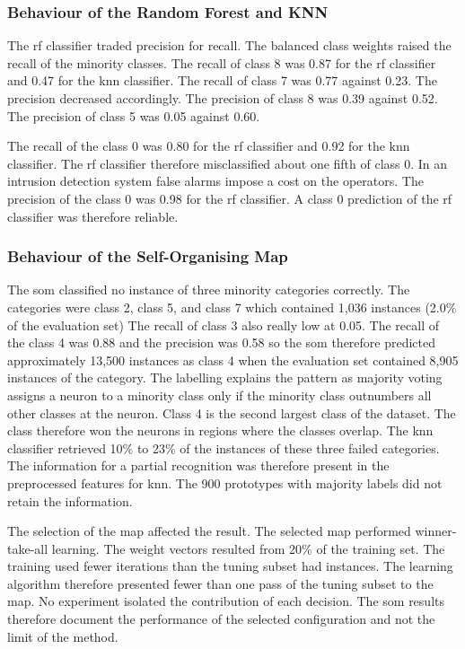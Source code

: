 \documentclass[conference]{IEEEtran}
\begin{document}
\subsubsection{Behaviour of the Random Forest and KNN}

The \gls{rf} classifier traded precision for recall.
The balanced class weights raised the recall of the minority classes.
The recall of class 8 was 0.87 for the \gls{rf} classifier and 0.47 for the \gls{knn} classifier.
The recall of class 7 was 0.77 against 0.23.
The precision decreased accordingly.
The precision of class 8 was 0.39 against 0.52.
The precision of class 5 was 0.05 against 0.60.

The recall of the class 0 was 0.80 for the \gls{rf} classifier and 0.92 for the \gls{knn} classifier.
The \gls{rf} classifier therefore misclassified about one fifth of class 0.
In an intrusion detection system false alarms impose a cost on the operators.
The precision of the class 0 was 0.98 for the \gls{rf} classifier.
A class 0 prediction of the \gls{rf} classifier was therefore reliable.

\subsubsection{Behaviour of the Self-Organising Map}

The \gls{som} classified no instance of three minority categories correctly.
The categories were class 2, class 5, and class 7 which contained 1,036 instances (2.0\% of the evaluation set)
The recall of class 3 also really low at 0.05.
The recall of the class 4 was 0.88 and the precision was 0.58 so the \gls{som} therefore predicted
approximately 13,500 instances as class 4 when the evaluation set contained 8,905 instances of the category.
The labelling explains the pattern as majority voting assigns a neuron to a minority class only if the minority
class outnumbers all other classes at the neuron.
Class 4 is the second largest class of the dataset.
The class therefore won the neurons in regions where the classes overlap.
The \gls{knn} classifier retrieved 10\% to 23\% of the instances of these three failed categories.
The information for a partial recognition was therefore present in the preprocessed features for \gls{knn}.
The 900 prototypes with majority labels did not retain the information.

The selection of the map affected the result.
The selected map performed winner-take-all learning.
The weight vectors resulted from 20\% of the training set.
The training used fewer iterations than the tuning subset had instances.
The learning algorithm therefore presented fewer than one pass of the tuning subset to the map.
No experiment isolated the contribution of each decision.
The \gls{som} results therefore document the performance of the selected configuration and not the limit of the method.
\end{document}
